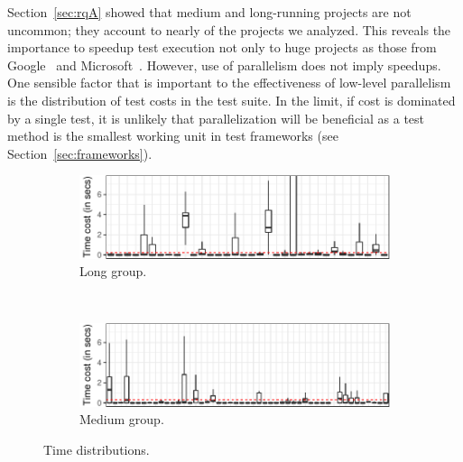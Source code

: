 Section~\ref{sec:rqA} showed that medium and long-running projects are
not uncommon; they account to nearly \percentMedLongRunning{} of the
\numSubjs{} projects we analyzed.  This reveals the importance to
speedup test execution not only to huge projects as those from
Google~\cite{google-tap,google-ci} and
Microsoft~\cite{prasad-shulte-ieee-microsoft-ci}.  However, use of
parallelism does not imply speedups.  One sensible factor that is
important to the effectiveness of low-level parallelism is the
distribution of test costs in the test suite.  In the limit, if cost
is dominated by a single test, it is unlikely that parallelization
will be beneficial as a test method is the smallest working unit in
test frameworks (see Section~\ref{sec:frameworks}).

\begin{figure}[t]
    \centering
    \begin{subfigure}{0.47\textwidth}
      \centering
      \includegraphics[width=\textwidth]{plots/testcost-long.pdf}
      \caption{\label{fig:longtcost}Long group.}
    \end{subfigure}\\
    \vspace{2ex}
    \begin{subfigure}{0.47\textwidth}
      \centering
      \includegraphics[width=\textwidth]{plots/testcost-medium.pdf}
      \caption{\label{fig:medtcost}Medium group.}
    \end{subfigure}
    \caption{\label{fig:time-distributions}Time distributions.}%
\end{figure}


